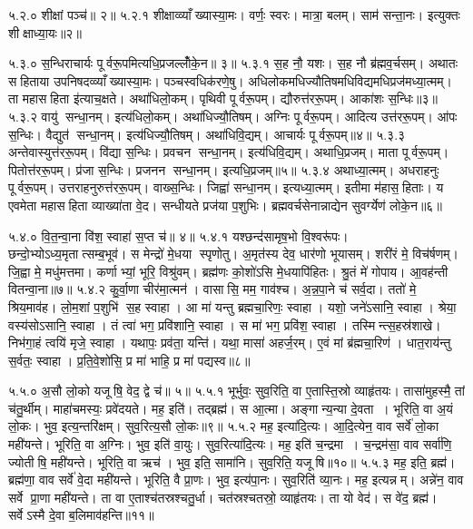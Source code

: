 ५.२.०
शीक्षां पञ्च॑॥ २॥
५.२.१
शीक्षाव्व्याँख्यास्या॒मः। वर्णः॒ स्वरः। मात्रा॒ बलम्। साम॑ सन्ता॒नः। इत्युक्तः  शीक्षाध्या॒यः॥२॥
\anuvakamend

५.३.०
स॒न्धिराचार्यः पूर्वरू॒पमित्यधि॒प्रजल्लोँ॑के॒न॥ ३॥
५.३.१
स॒ह नौ॒ यशः। स॒ह नौ ब्र॑ह्मव॒र्चसम्। अथातः सहिताया उपनिषदव्व्याँख्यास्या॒मः। पञ्चस्वधिक॑रणे॒षु। अधिलोकमधिज्यौतिषमधिविद्यमधिप्रज॑मध्या॒त्मम्। ता महासहिता इ॑त्याच॒क्षते। अथा॑धिलो॒कम्। पृथिवी पूर्वरू॒पम्। द्यौरुत्त॑ररू॒पम्। आका॑शः स॒न्धिः॥३॥
५.३.२
वायु॑ सन्धा॒नम्। इत्य॑धिलो॒कम्। अथा॑धिज्यौ॒तिषम्। अग्निः पूर्वरू॒पम्। आदित्य उत्त॑ररू॒पम्। आ॑पः स॒न्धिः। वैद्युत॑ सन्धा॒नम्। इत्य॑धिज्यौ॒तिषम्। अथा॑धिवि॒द्यम्। आचार्यः पूर्वरू॒पम्॥४॥
५.३.३
अन्तेवास्युत्त॑ररू॒पम्। वि॑द्या स॒न्धिः। प्रवचन सन्धा॒नम्। इत्य॑धिवि॒द्यम्। अथाधि॒प्रजम्। माता पूर्वरू॒पम्। पितोत्त॑ररू॒पम्। प्र॑जा स॒न्धिः। प्रजनन सन्धा॒नम्। इत्यधि॒प्रजम्॥५॥
५.३.४
अथाध्या॒त्मम्। अधराहनुः पूर्वरू॒पम्। उत्तराहनुरुत्त॑ररू॒पम्। वाख्स॒न्धिः। जिह्वा॑ सन्धा॒नम्। इत्यध्या॒त्मम्। इतीमा म॑हास॒हिताः। य एवमेता महासहिता व्याख्या॑ता वे॒द। सन्धीयते प्रज॑या प॒शुभिः। ब्रह्मवर्चसेनान्नाद्येन सुवर्ग्येण॑ लोके॒न॥६॥
\anuvakamend

५.४.०
वि॒त॒न्वा॒ना वि॑श॒ स्वाहा॑ स॒प्त च॑॥ ४॥
५.४.१
यश्छन्द॑सामृष॒भो वि॒श्वरू॑पः। छन्दो॒भ्योऽध्य॒मृतात्सम्ब॒भूव॑। स मेन्द्रो॑ मे॒धया स्पृणोतु। अ॒मृत॑स्य देव॒ धार॑णो भूयासम्। शरी॑रं मे॒ विच॑र्\mbox{}षणम्। जि॒ह्वा मे॒ मधु॑मत्तमा। कर्णाभ्यां॒ भूरि॒ विश्रु॑वम्। ब्रह्म॑णः को॒शो॑ऽसि मे॒धयापि॑हितः। श्रु॒तं मे॑ गोपाय। आ॒वह॑न्ती वितन्वा॒ना॥७॥
५.४.२
कु॒र्वा॒णा चीर॑मा॒त्मन॑। वासासि॒ मम॒ गाव॑श्च। अ॒न्न॒पा॒ने च॑ सर्व॒दा। ततो॑ मे॒ श्रिय॒माव॑ह। लो॒म॒शां प॒शुभि॑ स॒ह स्वाहा। आ मा॑ यन्तु ब्रह्मचा॒रिणः॒ स्वाहा। यशो॒ जने॑ऽसानि॒ स्वाहा। श्रेया॒\an{} वस्य॑सोऽसानि॒ स्वाहा। तं त्वा॑ भग॒ प्रवि॑शानि॒ स्वाहा। स मा॑ भग॒ प्रवि॑श॒ स्वाहा। तस्मिन्त्स॒हस्र॑शाखे। निभ॑गा॒हं त्वयि॑ मृजे॒ स्वाहा। यथापः॒ प्रव॑ता॒ यन्ति॑। यथा॒ मासा॑ अहर्ज॒रम्। ए॒वं मां ब्र॑ह्मचा॒रिण॑। धात॒राय॑न्तु स॒र्वतः॒ स्वाहा। प्र॒ति॒वे॒शो॑सि॒ प्र मा॑ भाहि॒ प्र मा॑ पद्यस्व॥८॥
\anuvakamend

५.५.०
अ॒सौ लो॒को यजूषि॒ वेद॒ द्वे च॑॥ ५॥
५.५.१
भूर्भुवः॒ सुव॒रिति॒ वा ए॒तास्ति॒स्रो व्याहृ॑तयः। तासा॑मुहस्मै॒ तां च॑तु॒र्थीम्। माहा॑चमस्यः॒ प्रवे॑दयते। मह॒ इति॑। तद्ब्रह्म॑। स आ॒त्मा। अङ्गान्य॒न्या दे॒वता। भूरिति॒ वा अ॒यं लो॒कः। भुव॒ इत्य॒न्तरि॑क्षम्। सुव॒रित्य॒सौ लो॒कः॥९॥
५.५.२
मह॒ इत्या॑दि॒त्यः। आ॒दि॒त्येन॒ वाव सर्वे॑ लो॒का मही॑यन्ते। भूरिति॒ वा अ॒ग्निः। भुव॒ इति॑ वा॒युः। सुव॒रित्या॑दि॒त्यः। मह॒ इति॑ च॒न्द्रमा। च॒न्द्रम॑सा॒ वाव सर्वा॑णि॒ ज्योतीषि॒ मही॑यन्ते। भूरिति॒ वा ऋच॑। भुव॒ इति॒ सामा॑नि। सुव॒रिति॒ यजूषि॥१०॥
५.५.३
मह॒ इति॒ ब्रह्म॑। ब्रह्म॑णा॒ वाव सर्वे॑ वे॒दा मही॑यन्ते। भूरिति॒ वै प्रा॒णः। भुव॒ इत्य॑पा॒नः। सुव॒रिति॑ व्या॒नः। मह॒ इत्यन्नम्। अन्ने॑न॒ वाव सर्वे प्रा॒णा मही॑यन्ते। ता वा ए॒ताश्च॑तस्रश्चतु॒र्धा। चत॑स्रश्चतस्रो॒ व्याहृ॑तयः। ता यो वेद॑। स वे॑द॒ ब्रह्म॑। सर्वेऽस्मै दे॒वा ब॒लिमाव॑हन्ति॥११॥
\anuvakamend

